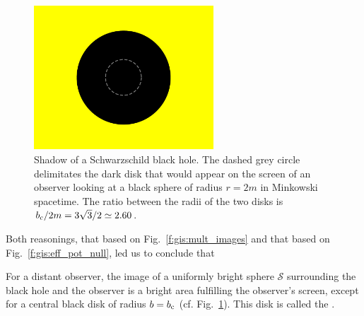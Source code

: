 \begin{figure}
\centerline{\includegraphics[width=0.6\textwidth]{gis_shadow.pdf}}
\caption[]{\label{f:gis:shadow} \footnotesize
Shadow of a Schwarzschild black hole. The dashed grey circle delimitates the
dark disk that would appear on the screen of an observer looking at
a black sphere of radius $r=2m$ in Minkowski spacetime. The ratio between
the radii of the two disks is $b_{\rm c} / 2m = 3\sqrt{3}/2 \simeq 2.60$.}
\end{figure}


Both reasonings, that based on Fig.~\ref{f:gis:mult_images} and that
based on Fig.~\ref{f:gis:eff_pot_null}, led us to conclude that
\begin{greybox}
For a distant observer, the image of a uniformly bright sphere $\mathscr{S}$ surrounding
the black hole and the observer is a bright area fulfilling
the observer's screen, except for a central black disk of radius $b=b_{\rm c}$
(cf. Fig.~\ref{f:gis:shadow}).
This disk is called the
.
\end{greybox}

